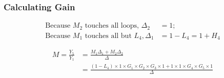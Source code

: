 \documentclass{article}
\begin{document}
\subsubsection*{Calculating Gain}
\begin{align*}
\text{Because } M_2 \text{ touches all loops, } \Delta_2 & = 1; \\
\text{Because } M_1 \text{ touches all but } L_4, \Delta_1 & = 1 - L_4 = 1 + H_4
\end{align*}

\begin{align*}
M = \frac{Y_5}{Y_1} & = \frac{M_1 \Delta_1 + M_2 \Delta_2}{\Delta} \\
& = \frac{(1 - L_4) \times 1 \times G_1 \times G_2 \times G_3 \times 1 + 1 \times 1 \times G_4 \times G_5 \times 1}{\Delta}
\end{align*}
\end{document}
